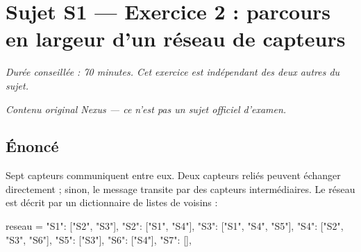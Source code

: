 \section*{Sujet S1 --- Exercice 2 : parcours en largeur d'un réseau de capteurs}

\textit{Durée conseillée : 70 minutes. Cet exercice est indépendant des deux
autres du sujet.}

\medskip
\textit{Contenu original Nexus --- ce n'est pas un sujet officiel d'examen.}

\subsection*{Énoncé}

Sept capteurs communiquent entre eux. Deux capteurs reliés peuvent échanger
directement ; sinon, le message transite par des capteurs intermédiaires. Le
réseau est décrit par un dictionnaire de listes de voisins :

\begin{python}
reseau = {
    "S1": ["S2", "S3"],
    "S2": ["S1", "S4"],
    "S3": ["S1", "S4", "S5"],
    "S4": ["S2", "S3", "S6"],
    "S5": ["S3"],
    "S6": ["S4"],
    "S7": [],
}
\end{python}

